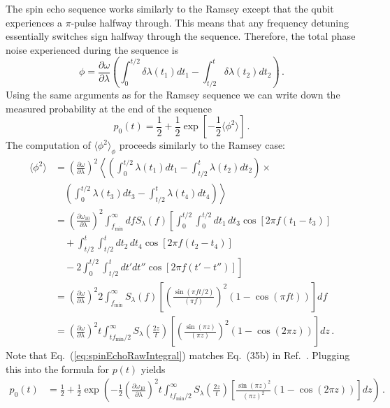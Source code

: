 

The spin echo sequence works similarly to the Ramsey except that the
qubit experiences a $\pi$-pulse halfway through.
This means that any frequency detuning essentially switches sign halfway through the sequence.
Therefore, the total phase noise experienced during the sequence is
\begin{equation}
  \phi = \frac{\partial\omega}{\partial\lambda} \left( \int_0^{t/2} \delta \lambda(t_1) dt_1 -\int_{t/2}^t \delta \lambda(t_2) dt_2 \right) \, .
\end{equation}
Using the same arguments as for the Ramsey sequence we can write down the measured probability at the end of the sequence
\begin{equation}
  p_0(t) = \frac{1}{2}+\frac{1}{2}\exp\left[-\frac{1}{2}\langle\phi^{2}\rangle \right] \, .
\end{equation}
The computation of $\langle\phi^2 \rangle_\phi$ proceeds similarly to the Ramsey case:
\begin{align}
  \langle\phi^{2}\rangle
  &= \left( \frac{\partial\omega}{\partial\lambda} \right)^2 \left\langle \left( \int_0^{t/2} \lambda(t_1) dt_1 - \int_{t/2}^t \lambda(t_2) dt_2 \right) \times \right. \nonumber \\
  & \quad \left. \left( \int_0^{t/2} \lambda(t_3) dt_{3} - \int_{t/2}^t \lambda(t_4) dt_4 \right) \right \rangle \nonumber \\
  & = \left( \frac{\partial \omega_{10}}{\partial\lambda} \right)^2
  \int_{f_{\textrm{min}}}^{\infty} df S_{\lambda}(f)
  \left[
  \int_0^{t/2} \int_0^{t/2} dt_1 \, dt_3 \cos[2\pi f (t_1 - t_3)] \right. \nonumber \\
  & \quad + \int_{t/2}^t \int_{t/2}^t dt_{2} \, dt_{4} \cos[2\pi f (t_2-t_4)] \nonumber \\
  & \quad - 2 \left. \int_{0}^{t/2}\int_{t/2}^{t} dt'dt'' \cos[2\pi f (t'-t'')] \right] \nonumber \\
  & = \left( \frac{\partial\omega}{\partial\lambda} \right)^2 2 \int_{f_{\text{min}}}^\infty S_\lambda (f) \left[ \left(\frac{\sin\left(\pi ft/2\right)}{\left(\pi f\right)}\right)^2 \left( 1 - \cos \left( \pi f t \right) \right) \right]df
  \label{eq:spinEchoRawIntegral} \\
  & = \left( \frac{\partial\omega}{\partial\lambda}\right)^2 t \int_{t f_{\text{min}}/2}^{\infty} S_\lambda \left( \frac{2 z}{t} \right) \left[ \left( \frac{\sin\left(\pi z\right)}{\left(\pi z\right)} \right)^2 \left(1 - \cos\left(2 \pi z \right) \right) \right] dz \, .
\end{align}
Note that Eq.~(\ref{eq:spinEchoRawIntegral}) matches Eq.~(35b) in Ref.~\cite{Martinis:bias_noise:2003}.
Plugging this into the formula for $p(t)$ yields
\begin{align}
  p_0(t)
  &= \frac{1}{2} + \frac{1}{2} \exp \left( - \frac{1}{2} \left( \frac{\partial\omega_{10}}{\partial\lambda} \right)^{2} t \int_{t f_{\text{min}}/2}^{\infty} S_\lambda \left( \frac{2z}{t} \right) \left[ \frac{\sin\left(\pi z\right)^{2}}{\left(\pi z\right)^{2}} \left(1 - \cos\left(2\pi z\right)\right) \right] dz \right) \, .
\end{align}


